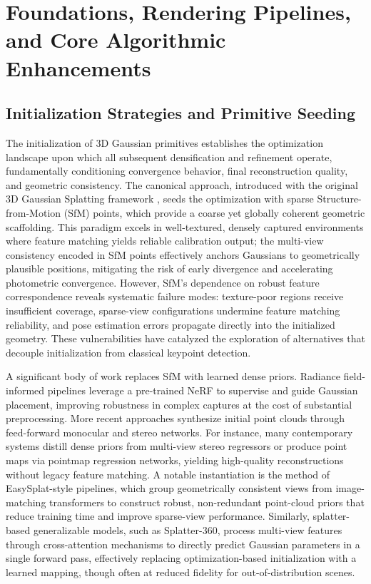 \documentclass[11pt,a4paper]{article}
\begin{document}
\section{Foundations, Rendering Pipelines, and Core Algorithmic Enhancements}



\subsection{Initialization Strategies and Primitive Seeding}


The initialization of 3D Gaussian primitives establishes the optimization landscape upon which all subsequent densification and refinement operate, fundamentally conditioning convergence behavior, final reconstruction quality, and geometric consistency. The canonical approach, introduced with the original 3D Gaussian Splatting framework \cite{arxiv:2308.04079v1}, seeds the optimization with sparse Structure-from-Motion (SfM) points, which provide a coarse yet globally coherent geometric scaffolding. This paradigm excels in well-textured, densely captured environments where feature matching yields reliable calibration output; the multi-view consistency encoded in SfM points effectively anchors Gaussians to geometrically plausible positions, mitigating the risk of early divergence and accelerating photometric convergence. However, SfM's dependence on robust feature correspondence reveals systematic failure modes: texture-poor regions receive insufficient coverage, sparse-view configurations undermine feature matching reliability, and pose estimation errors propagate directly into the initialized geometry. These vulnerabilities have catalyzed the exploration of alternatives that decouple initialization from classical keypoint detection.

A significant body of work replaces SfM with learned dense priors. Radiance field-informed pipelines \cite{arxiv:2403.13806v1} leverage a pre-trained NeRF to supervise and guide Gaussian placement, improving robustness in complex captures at the cost of substantial preprocessing. More recent approaches synthesize initial point clouds through feed-forward monocular and stereo networks. For instance, many contemporary systems distill dense priors from multi-view stereo regressors or produce point maps via pointmap regression networks, yielding high-quality reconstructions without legacy feature matching. A notable instantiation is the method of EasySplat-style pipelines, which group geometrically consistent views from image-matching transformers to construct robust, non-redundant point-cloud priors that reduce training time and improve sparse-view performance. Similarly, splatter-based generalizable models, such as Splatter-360, process multi-view features through cross-attention mechanisms to directly predict Gaussian parameters in a single forward pass, effectively replacing optimization-based initialization with a learned mapping, though often at reduced fidelity for out-of-distribution scenes.
\end{document}
